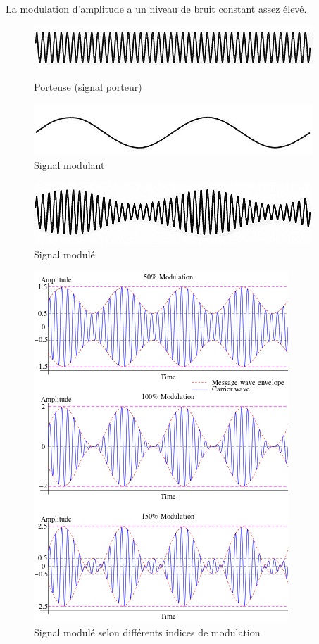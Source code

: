 La modulation d'amplitude a un niveau de bruit constant assez élevé. 

\begin{figure}[H]
    \centering
    \begin{minipage}[t]{0.45\linewidth}
        \centering
        \includegraphics[width=0.75\linewidth]{img/signal_porteur.png}
        \caption{Porteuse (signal porteur)}
    \end{minipage}
    \begin{minipage}[t]{0.45\linewidth}
        \centering
        \includegraphics[width=0.75\linewidth]{img/signal_modulant.png}
        \caption{Signal modulant}
    \end{minipage}
\end{figure}

\begin{figure}[H]
    \begin{center}
        \includegraphics[width=0.335\linewidth]{img/signal_module.png}
        \caption{Signal modulé}
    \end{center}
\end{figure}

\begin{figure}[H]
    \begin{center}
        \includegraphics[width=0.5\linewidth]{img/indice_de_modulation_AM.png}
        \caption{Signal modulé selon différents indices de modulation}
    \end{center}
\end{figure}

